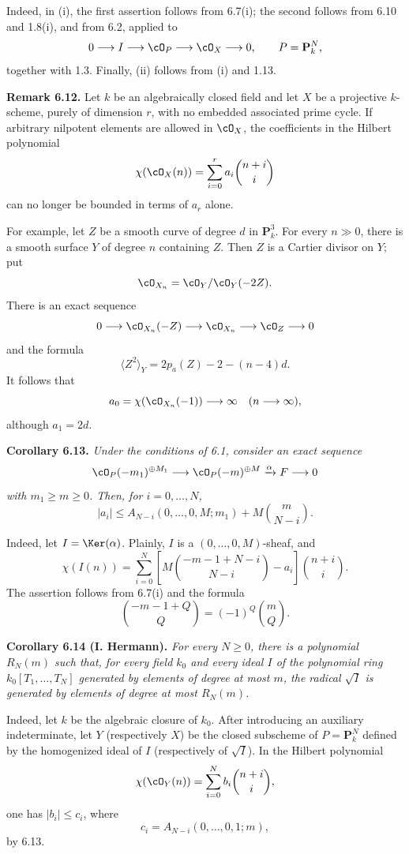 Indeed, in (i), the first assertion follows from 6.7(i); the second follows from 6.10 and 1.8(i), and from 6.2, applied to
\[
  0\longrightarrow I\longrightarrow\cO_P\longrightarrow\cO_X\longrightarrow0,
  \qquad P=\mathbf P^N_k,
\]
together with 1.3. Finally, (ii) follows from (i) and 1.13.

\textbf{Remark 6.12.} Let $k$ be an algebraically closed field and let $X$ be a projective $k$-scheme, purely of dimension $r$, with no embedded associated prime cycle. If arbitrary nilpotent elements are allowed in $\cO_X$, the coefficients in the Hilbert polynomial
\[
  \chi(\cO_X(n))=\sum_{i=0}^{r}a_i\binom{n+i}{i}
\]
can no longer be bounded in terms of $a_r$ alone.

For example, let $Z$ be a smooth curve of degree $d$ in $\mathbf P^3_k$. For every $n\gg0$, there is a smooth surface $Y$ of degree $n$ containing $Z$. Then $Z$ is a Cartier divisor on $Y$; put
\[
  \cO_{X_n}=\cO_Y/\cO_Y(-2Z).
\]
There is an exact sequence
\[
  0\longrightarrow\cO_{X_n}(-Z)\longrightarrow
  \cO_{X_n}\longrightarrow\cO_Z\longrightarrow0
\]
and the formula
\[
  \langle Z^2\rangle_Y=2p_a(Z)-2-(n-4)d.
\]
It follows that
\[
  a_0=\chi(\cO_{X_n}(-1))\longrightarrow\infty
  \quad(n\longrightarrow\infty),
\]
although $a_1=2d$.

\textbf{Corollary 6.13.} \emph{Under the conditions of 6.1, consider an exact sequence
\[
  \cO_P(-m_1)^{\oplus M_1}\longrightarrow
  \cO_P(-m)^{\oplus M}\xrightarrow{\alpha}F\longrightarrow0
\]
with $m_1\geq m\geq0$. Then, for $i=0,\ldots,N$,
\[
  |a_i|\leq A_{N-i}(0,\ldots,0,M;m_1)
  +M\binom{m}{N-i}.
\]}

Indeed, let $I=\Ker(\alpha)$. Plainly, $I$ is a $(0,\ldots,0,M)$-sheaf, and
\[
  \chi(I(n))=\sum_{i=0}^{N}
  \left[M\binom{-m-1+N-i}{N-i}-a_i\right]
  \binom{n+i}{i}.
\]
The assertion follows from 6.7(i) and the formula
\[
  \binom{-m-1+Q}{Q}=(-1)^Q\binom{m}{Q}.
\]

\textbf{Corollary 6.14 (I. Hermann).} \emph{For every $N\geq0$, there is a polynomial $R_N(m)$ such that, for every field $k_0$ and every ideal $I$ of the polynomial ring $k_0[T_1,\ldots,T_N]$ generated by elements of degree at most $m$, the radical $\sqrt I$ is generated by elements of degree at most $R_N(m)$.}

Indeed, let $k$ be the algebraic closure of $k_0$. After introducing an auxiliary indeterminate, let $Y$ (respectively $X$) be the closed subscheme of $P=\mathbf P^N_k$ defined by the homogenized ideal of $I$ (respectively of $\sqrt I$). In the Hilbert polynomial
\[
  \chi(\cO_Y(n))=\sum_{i=0}^{N}b_i\binom{n+i}{i},
\]
one has $|b_i|\leq c_i$, where
\[
  c_i=A_{N-i}(0,\ldots,0,1;m),
\]
by 6.13.

